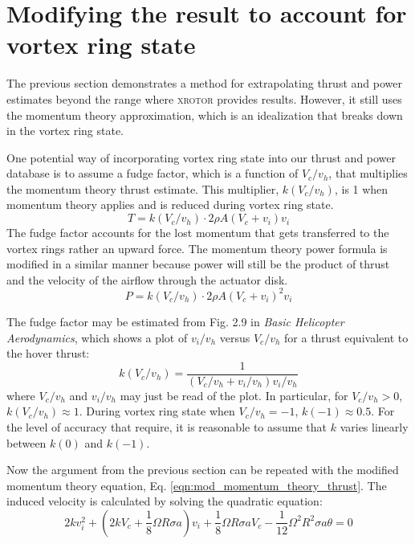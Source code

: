 \documentclass[11pt]{amsart}
\begin{document}
\section{Modifying the result to account for vortex ring state}

The previous section demonstrates a method for extrapolating thrust
and power estimates beyond the range where \textsc{xrotor} provides
results.  However, it still uses the momentum theory approximation,
which is an idealization that breaks down in the vortex ring state.

One potential way of incorporating vortex ring state into our thrust
and power database is to assume a fudge factor, which is a function of
$V_c/v_h$, that multiplies the momentum theory thrust estimate.  This
multiplier, $k(V_c/v_h)$, is 1 when momentum theory applies and is
reduced during vortex ring state.
\begin{equation}
  T = k(V_c/v_h) \cdot 2 \rho A (V_c + v_i) v_i
  \label{eqn:mod_momentum_theory_thrust}
\end{equation}
The fudge factor accounts for the lost momentum that gets transferred
to the vortex rings rather an upward force.  The momentum theory power
formula is modified in a similar manner because power will still be
the product of thrust and the velocity of the airflow through the
actuator disk.
\begin{equation}
  P = k(V_c/v_h) \cdot 2 \rho A (V_c + v_i)^2 v_i
\end{equation}

The fudge factor may be estimated from Fig. 2.9 in \textit{Basic
  Helicopter Aerodynamics}, which shows a plot of $v_i/v_h$ versus
$V_c/v_h$ for a thrust equivalent to the hover thrust:
\begin{equation}
  k(V_c/v_h) = \frac{1}{(V_c/v_h + v_i/v_h) v_i/v_h}
\end{equation}
where $V_c/v_h$ and $v_i/v_h$ may just be read of the plot.  In
particular, for $V_c/v_h > 0$, $k(V_c/v_h) \approx 1$.  During vortex
ring state when $V_c/v_h = -1$, $k(-1) \approx 0.5$.  For the level of
accuracy that require, it is reasonable to assume that $k$ varies
linearly between $k(0)$ and $k(-1)$.

Now the argument from the previous section can be repeated with the
modified momentum theory equation,
Eq. \ref{eqn:mod_momentum_theory_thrust}.  The induced velocity is
calculated by solving the quadratic equation:
\begin{equation}
  2 k v_i^2 + \left(2 k V_c + \frac{1}{8} \Omega R \sigma a\right) v_i +
  \frac{1}{8} \Omega R \sigma a V_c - \frac{1}{12} \Omega^2 R^2 \sigma a \theta
  = 0
\end{equation}
\end{document}
